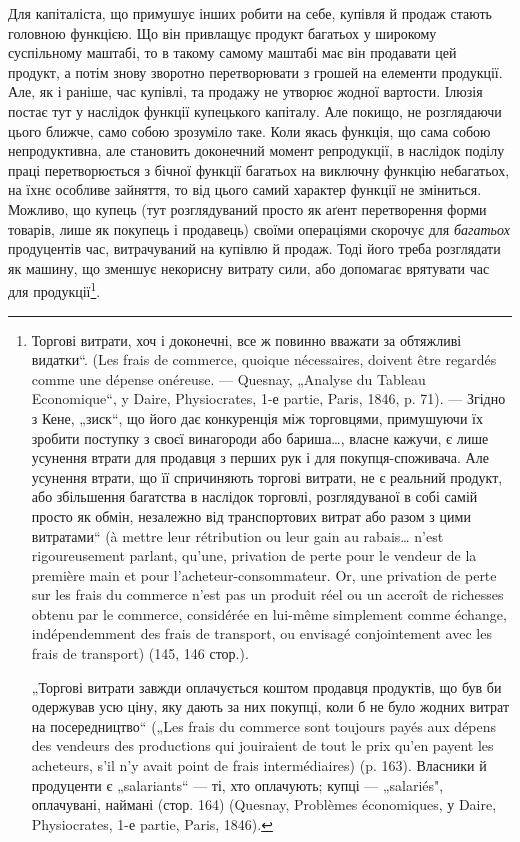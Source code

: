 Для капіталіста, що примушує інших робити на себе, купівля й
продаж стають головною функцією. Що він привлащує продукт багатьох
у широкому суспільному маштабі, то в такому самому маштабі має він
продавати цей продукт, а потім знову зворотно перетворювати з грошей
на елементи продукції. Але, як і раніше, час купівлі, та продажу не
утворює жодної вартости. Ілюзія постає тут у наслідок функції купецького
капіталу. Але покищо, не розглядаючи цього ближче, само собою
зрозуміло таке. Коли якась функція, що сама собою непродуктивна, але
становить доконечний момент репродукції, в наслідок поділу праці перетворюється
з бічної функції багатьох на виключну функцію небагатьох,
на їхнє особливе зайняття, то від цього самий характер функції не зміниться.
Можливо, що купець (тут розглядуваний просто як аґент перетворення
форми товарів, лише як покупець і продавець) своїми операціями
скорочує для \emph{багатьох} продуцентів час, витрачуваний на купівлю
й продаж. Тоді його треба розглядати як машину, що зменшує некорисну
витрату сили, або допомагає врятувати час для продукції\footnote{
Торгові витрати, хоч і доконечні, все ж повинно вважати за обтяжливі видатки“.
(Les frais de commerce, quoique nécessaires, doivent être regardés comme une
dépense onéreuse. — Quesnay, „Analyse du Tableau Economique“, y Daire, Physiocrates,
1-е partie, Paris, 1846, p. 71). — Згідно з Кене, „зиск“, що його дає конкуренція
між торговцями, примушуючи їх зробити поступку з своєї винагороди або бариша\dots{},
власне кажучи, є лише усунення втрати для продавця з перших
рук і для покупця-споживача. Але усунення втрати, що її спричиняють торгові
витрати, не є реальний продукт, або збільшення багатства в наслідок торговлі,
розглядуваної в собі самій просто як обмін, незалежно від транспортових витрат
або разом з цими витратами“ (à mettre leur rétribution ou leur gain au rabais\dots{}
n’est rigoureusement parlant, qu’une, privation de perte pour le vendeur de la première
main et pour l’acheteur-consommateur. Or, une privation de perte sur les frais du
commerce n'est pas un produit réel ou un accroît de richesses obtenu par le commerce,
considérée en lui-même simplement comme échange, indépendemment des frais de transport, ou envisagé
conjointement avec les frais de transport) (145, 146 стор.).

„Торгові витрати завжди оплачується коштом продавця продуктів, що був би
одержував усю ціну, яку дають за них покупці, коли б не було жодних витрат
на посередництво“ („Les frais du commerce sont toujours payés aux dépens des
vendeurs des productions qui jouiraient de tout le prix qu’en payent les acheteurs,
s’il n’y avait point de frais intermédiaires) (p. 163). Власники й продуценти є
„salariants“ — ті, хто оплачують; купці — „salariés", оплачувані, наймані (стор. 164)
(Quesnay, Problèmes économiques, у Daire, Physiocrates, 1-е partie, Paris, 1846).
}.


